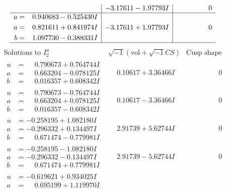 \documentclass[1p]{elsarticle_modified}
\theoremstyle{definition}
\newcommand{\I}{\sqrt{-1}}
\begin{document}
$$\begin{array}{c|c|c}
 & -3.17611 - 1.97793 I & \phantom{-0.000000 } 0 \\ \hline\begin{aligned}
u &= \phantom{-}0.940683 - 0.525430 I \\
a &= \phantom{-}0.821611 + 0.841974 I \\
b &= \phantom{-}1.097730 - 0.388331 I\end{aligned}
 & -3.17611 + 1.97793 I & \phantom{-0.000000 } 0\\
 \hline 
 \end{array}$$\newpage$$\begin{array}{c|c|c}  
\text{Solutions to }I^u_{2}& \I (\text{vol} + \sqrt{-1}CS) & \text{Cusp shape}\\
 \hline 
\begin{aligned}
u &= \phantom{-}0.790673 + 0.764744 I \\
a &= \phantom{-}0.663204 - 0.078125 I \\
b &= \phantom{-}0.016357 + 0.608342 I\end{aligned}
 & \phantom{-}0.10617 + 3.36466 I & \phantom{-0.000000 } 0 \\ \hline\begin{aligned}
u &= \phantom{-}0.790673 - 0.764744 I \\
a &= \phantom{-}0.663204 + 0.078125 I \\
b &= \phantom{-}0.016357 - 0.608342 I\end{aligned}
 & \phantom{-}0.10617 - 3.36466 I & \phantom{-0.000000 } 0 \\ \hline\begin{aligned}
u &= -0.258195 + 1.082180 I \\
a &= -0.296332 + 0.134497 I \\
b &= \phantom{-}0.671474 - 0.779981 I\end{aligned}
 & \phantom{-}2.91739 + 5.62744 I & \phantom{-0.000000 } 0 \\ \hline\begin{aligned}
u &= -0.258195 - 1.082180 I \\
a &= -0.296332 - 0.134497 I \\
b &= \phantom{-}0.671474 + 0.779981 I\end{aligned}
 & \phantom{-}2.91739 - 5.62744 I & \phantom{-0.000000 } 0 \\ \hline\begin{aligned}
u &= -0.619621 + 0.934025 I \\
a &= \phantom{-}0.695199 + 1.119970 I \\

\end{aligned}
\end{array}$$
\end{document}
